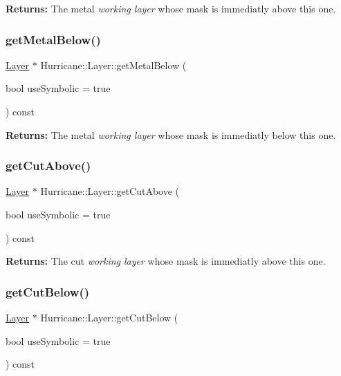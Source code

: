 {\bfseries Returns\+:} The metal {\itshape working layer} whose mask is immediatly above this one. \mbox{\label{classHurricane_1_1Layer_a4bc8358f67c1a1a9b2581e4b3732108c}} 
\subsubsection{\texorpdfstring{get\+Metal\+Below()}{getMetalBelow()}}
{\footnotesize\ttfamily \mbox{\hyperlink{classHurricane_1_1Layer}{Layer}} $\ast$ Hurricane\+::\+Layer\+::get\+Metal\+Below (\begin{DoxyParamCaption}\item[{bool}]{use\+Symbolic = {\ttfamily true} }\end{DoxyParamCaption}) const}

{\bfseries Returns\+:} The metal {\itshape working layer} whose mask is immediatly below this one. \mbox{\label{classHurricane_1_1Layer_ad9fca94fed1837e3e80e9b6445822b7d}} 
\subsubsection{\texorpdfstring{get\+Cut\+Above()}{getCutAbove()}}
{\footnotesize\ttfamily \mbox{\hyperlink{classHurricane_1_1Layer}{Layer}} $\ast$ Hurricane\+::\+Layer\+::get\+Cut\+Above (\begin{DoxyParamCaption}\item[{bool}]{use\+Symbolic = {\ttfamily true} }\end{DoxyParamCaption}) const}

{\bfseries Returns\+:} The cut {\itshape working layer} whose mask is immediatly above this one. \mbox{\label{classHurricane_1_1Layer_a983956c8127688390f978cc5bd0d768d}} 
\subsubsection{\texorpdfstring{get\+Cut\+Below()}{getCutBelow()}}
{\footnotesize\ttfamily \mbox{\hyperlink{classHurricane_1_1Layer}{Layer}} $\ast$ Hurricane\+::\+Layer\+::get\+Cut\+Below (\begin{DoxyParamCaption}\item[{bool}]{use\+Symbolic = {\ttfamily true} }\end{DoxyParamCaption}) const}

